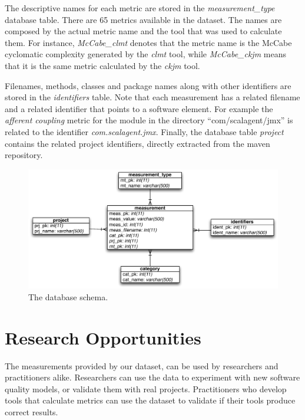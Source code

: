 \documentclass[conference]{IEEEtran}
\begin{document}
The descriptive names for each metric are stored in the \textit{measurement\_type} database table. There are 65 metrics available in the dataset. The names are composed by the actual metric name and the tool that was used to calculate them. For instance, \textit{McCabe\_clmt} denotes that the metric name is the McCabe cyclomatic complexity generated by the \textit{clmt} tool, while \textit{McCabe\_ckjm} means that it is the same metric calculated by the \textit{ckjm} tool.

Filenames, methods, classes and package names along with other identifiers are stored in the \textit{identifiers} table. Note that each measurement has a related filename and a related identifier that points to a software element. For example the \textit{afferent coupling} metric for the module in the directory ``com/scalagent/jmx'' is related to the identifier \textit{com.scalagent.jmx}.
Finally, the database table \textit{project} contains the related project identifiers, directly extracted from the maven repository.

\begin{figure}
\centering
\includegraphics[scale=0.65]{database-schema}
\caption{The database schema.}
\label{fig:database-schema}
\end{figure}

\section{Research Opportunities}
\label{sec:research-opportunities}

The measurements provided by our dataset, can be used by researchers and practitioners alike. Researchers can use the data to experiment with new software quality models, or validate them with real projects. Practitioners who develop tools that calculate metrics can use the dataset to validate if their tools produce correct results.
\end{document}
